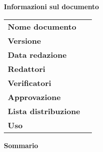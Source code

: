\begin{center}
	\textbf{\Large Informazioni sul documento} \\[0.5cm]
	\begin{longtable}{ l | p{6cm} }
		\textbf{Nome documento} &  {\documentName}\\
		\textbf{Versione} & {\currentVersion} \\
		\textbf{Data redazione} & {\redactionDate} \\
		\textbf{Redattori} & \parbox{\textwidth}{\editors} \\
		\textbf{Verificatori} & \parbox{\textwidth}{\verifiers} \\
		\textbf{Approvazione} & \parbox{\textwidth}{\approved} \\
		\textbf{Lista distribuzione} & \parbox{\textwidth}{\distributionList} \\
		\textbf{Uso} & \parbox{\textwidth}{\usage} 
		\\
	\end{longtable}
	\vspace{0.5cm}
\textbf{\Large Sommario} \\[0.4cm]
\sommario
\end{center}